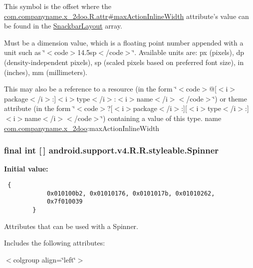This symbol is the offset where the \hyperlink{classcom_1_1companyname_1_1x__2doo_1_1_r_1_1attr_0d806868df1eab18224e192dd5e8239d}{com.companyname.x\_\-2doo.R.attr\#maxActionInlineWidth} attribute's value can be found in the \hyperlink{classandroid_1_1support_1_1v4_1_1_r_1_1styleable_f3b816b2bb4147ee0c0cb792ff6d7454}{SnackbarLayout} array.

Must be a dimension value, which is a floating point number appended with a unit such as \char`\"{}$<$code$>$14.5sp$<$/code$>$\char`\"{}. Available units are: px (pixels), dp (density-independent pixels), sp (scaled pixels based on preferred font size), in (inches), mm (millimeters). 

This may also be a reference to a resource (in the form \char`\"{}$<$code$>$@\mbox{[}$<$i$>$package$<$/i$>$:\mbox{]}$<$i$>$type$<$/i$>$:$<$i$>$name$<$/i$>$$<$/code$>$\char`\"{}) or theme attribute (in the form \char`\"{}$<$code$>$?\mbox{[}$<$i$>$package$<$/i$>$:\mbox{]}\mbox{[}$<$i$>$type$<$/i$>$:\mbox{]}$<$i$>$name$<$/i$>$$<$/code$>$\char`\"{}) containing a value of this type.  name \hyperlink{namespacecom_1_1companyname_1_1x__2doo}{com.companyname.x\_\-2doo}:maxActionInlineWidth \hypertarget{classandroid_1_1support_1_1v4_1_1_r_1_1styleable_7b6b9d4f9b35dbabe5f917505d63c414}{
\subsubsection[{Spinner}]{\setlength{\rightskip}{0pt plus 5cm}final int \mbox{[}$\,$\mbox{]} android.support.v4.R.R.styleable.Spinner}}
\label{classandroid_1_1support_1_1v4_1_1_r_1_1styleable_7b6b9d4f9b35dbabe5f917505d63c414}


\textbf{Initial value:}

\begin{Code}\begin{verbatim} {
            0x010100b2, 0x01010176, 0x0101017b, 0x01010262,
            0x7f010039
        }
\end{verbatim}
\end{Code}
Attributes that can be used with a Spinner. 

Includes the following attributes: \begin{TabularC}{0}
\hline
\end{TabularC}
$<$colgroup align=\char`\"{}left\char`\"{}$>$ 


